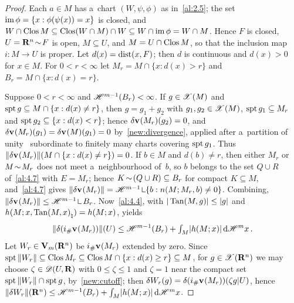 \begin{proof}
    Each $a \in M$ has a~chart $(W,\psi,\phi)$ as in~\ref{al:2.5}; the set $\operatorname{im} \phi = \{ x :
    \phi(\psi(x)) = x \}$ is closed, and $W \cap \mathop{\mathrm{Clos}}M \subseteq \mathop{\mathrm{Clos}}(W \cap M) \cap W \subseteq
    W \cap \operatorname{im} \phi = W \cap M$. Hence $F$ is closed, $U = \mathbf{R}^{n} \!\sim\! F$ is open, $M
    \subseteq U$, and $M = U \cap \mathop{\mathrm{Clos}}M$, so that the inclusion map $i : M \to U$ is proper. Let
    $d(x) = \operatorname{dist}(x,F)$; then $d$ is continuous and $d(x) > 0$ for $x \in M$. For $0 < r < \infty$
    let $M_r = M \cap \{ x : d(x) > r \}$ and $B_r = M \cap \{ x : d(x) = r \}$.

    Suppose $0 < r < \infty$ and $\mathscr{H}^{m-1}(B_r) < \infty$. If $g \in \mathscr{X}(M)$ and $\operatorname{spt} g \subseteq M
    \cap \{ x : d(x) \ne r \}$, then $g = g_1 + g_2$ with $g_1, g_2 \in \mathscr{X}(M)$, $\operatorname{spt} g_1
    \subseteq M_r$ and $\operatorname{spt} g_2 \subseteq \{ x : d(x) < r \}$; hence $\delta \mathbf{v}_{}(M_r)(g_2) =
    0$, and $\delta \mathbf{v}_{}(M_r)(g_1) = \delta \mathbf{v}_{}(M)(g_1) = 0$ by~\ref{new:divergence},
    applied after a~partition of unity~\cite[3.1.13]{Federer1969} subordinate to finitely many
    charts covering $\operatorname{spt} g_1$. Thus $\|\delta \mathbf{v}_{}(M_r)\|(M \cap \{ x : d(x) \ne r \}) = 0$. If
    $b \in M$ and $d(b) \ne r$, then either $M_r$ or $M \!\sim\! M_r$ does not meet a~neighbourhood
    of~$b$, so $b$ belongs to the set $Q \cup R$ of~\ref{al:4.7} with $E = M_r$; hence $K
    \!\sim\! (Q \cup R) \subseteq B_r$ for compact $K \subseteq M$, and~\ref{al:4.7} gives
    $\|\delta \var{}(M_r)\| = \HM^{m-1} \restrict \{ b : n(M;M_r,b) \ne 0 \}$. Combining, $\|\delta
    \var{}(M_r)\| \le \HM^{m-1} \restrict B_r$. Now~\ref{al:4.4}, with $|\operatorname{Tan}(M,g)| \le |g|$ and
    $h(M;x,{\operatorname{Tan}(M,x)}_\natural) = h(M;x)$, yields
    \begin{displaymath}
        \|\delta(i_\# \mathbf{v}_{}(M_r))\|(U) \le \mathscr{H}^{m-1}(B_r) + {\textstyle\int_{M}^{}} |h(M;x)| \,\mathrm{d} \mathscr{H}^m x \,.
    \end{displaymath}
    Let $W_r \in \mathbf{V}_{m}(\mathbf{R}^{n})$ be $i_\# \mathbf{v}_{}(M_r)$ extended by zero. Since $\operatorname{spt}
    \|W_r\| \subseteq \mathop{\mathrm{Clos}}M_r \subseteq \mathop{\mathrm{Clos}}M \cap \{ x : d(x) \ge r \} \subseteq M$, for $g \in
    \mathscr{X}(\mathbf{R}^{n})$ we may choose $\zeta \in \mathscr{D}(U,\mathbf{R})$ with $0 \le \zeta \le 1$ and $\zeta =
    1$ near the compact set $\operatorname{spt} \|W_r\| \cap \operatorname{spt} g$, by~\ref{new:cutoff}; then $\delta W_r(g) =
    \delta(i_\# \mathbf{v}_{}(M_r))(\zeta g|U)$, hence $\|\delta W_r\|(\mathbf{R}^{n}) \le \mathscr{H}^{m-1}(B_r) +
    {\textstyle\int_{M}^{}} |h(M;x)| \,\mathrm{d} \mathscr{H}^m x$.


\end{proof}
